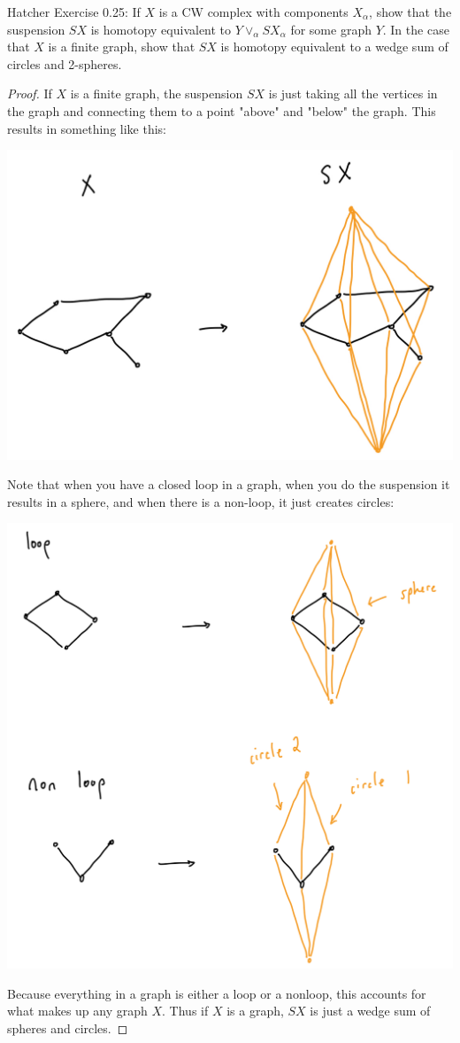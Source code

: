 \documentclass[12pt]{article}
\newenvironment{statement}[2][Statement]{\begin{trivlist}
\item[\hskip \labelsep {\bfseries #1}\hskip \labelsep {\bfseries #2.}]}{\end{trivlist}}
\begin{document}
\begin{statement}[Exercise]{4}
    Hatcher Exercise 0.25: If $X$ is a CW complex with components $X_{\alpha}$, show that the suspension $SX$ is homotopy equivalent to $Y \vee_{\alpha} SX_{\alpha}$ for some graph $Y$. In the case that $X$ is a finite graph, show that $SX$ is homotopy equivalent to a wedge sum of circles and 2-spheres. 
\end{statement}
\begin{proof}
    If $X$ is a finite graph, the suspension $SX$ is just taking all the vertices in the graph and connecting them to a point "above" and "below" the graph. This results in something like this: 
    \par \includegraphics[scale=.2]{2.4.1.png}
    \par Note that when you have a closed loop in a graph, when you do the suspension it results in a sphere, and when there is a non-loop, it just creates circles:
    \par \includegraphics[scale=.2]{2.4.2.png}
    \par Because everything in a graph is either a loop or a nonloop, this accounts for what makes up any graph $X$. Thus if $X$ is a graph, $SX$ is just a wedge sum of spheres and circles. 
\end{proof}
\end{document}
